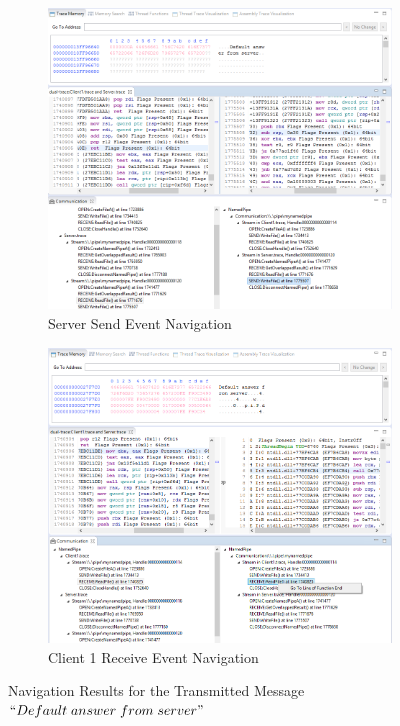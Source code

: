 \begin{figure}[H]
\begin{subfigure}[H]{0.45\linewidth}
\includegraphics[scale=0.35]{Figures/result21_server_send}
 \caption{Server Send Event Navigation}
\label{result21_server_send}
\end{subfigure}
\hfill
\begin{subfigure}[H]{0.45\linewidth}
\includegraphics[scale=0.35]{Figures/result21_client_read}
 \caption{Client 1 Receive Event Navigation}
\label{result21_client_read}
\end{subfigure}%
\caption{Navigation Results for the Transmitted Message $``Default\; answer\; from\; server"$}
\label{result21_server_to_client}
\end{figure}

